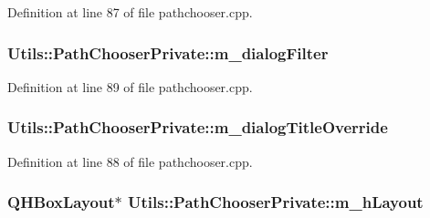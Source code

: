 \-Definition at line 87 of file pathchooser.\-cpp.

\hypertarget{struct_utils_1_1_path_chooser_private_aa4d089b9547a21ea1d39c8c8151b82d9}{
\subsubsection[{m\-\_\-dialog\-Filter}]{ {\bf \-Utils\-::\-Path\-Chooser\-Private\-::m\-\_\-dialog\-Filter}}}\label{struct_utils_1_1_path_chooser_private_aa4d089b9547a21ea1d39c8c8151b82d9}


\-Definition at line 89 of file pathchooser.\-cpp.

\hypertarget{struct_utils_1_1_path_chooser_private_a5a95de28d99841640ca55678d9795a62}{
\subsubsection[{m\-\_\-dialog\-Title\-Override}]{ {\bf \-Utils\-::\-Path\-Chooser\-Private\-::m\-\_\-dialog\-Title\-Override}}}\label{struct_utils_1_1_path_chooser_private_a5a95de28d99841640ca55678d9795a62}


\-Definition at line 88 of file pathchooser.\-cpp.

\hypertarget{struct_utils_1_1_path_chooser_private_a774f99b0dc2901501561d86a347c1966}{
\subsubsection[{m\-\_\-h\-Layout}]{\setlength{\rightskip}{0pt plus 5cm}\-Q\-H\-Box\-Layout$\ast$ {\bf \-Utils\-::\-Path\-Chooser\-Private\-::m\-\_\-h\-Layout}}}\label{struct_utils_1_1_path_chooser_private_a774f99b0dc2901501561d86a347c1966}


